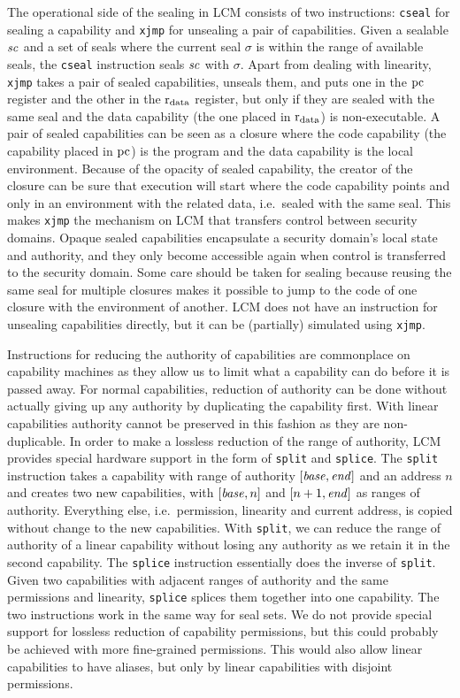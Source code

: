 \documentclass{jfp}
\newcommand{\trgcm}{\textsc{LCM}}
\begin{document}
The operational side of the sealing in \trgcm{} consists of two instructions: \texttt{cseal} for sealing a capability and \texttt{xjmp} for unsealing a pair of capabilities.
Given a sealable $\mathit{sc}$ and a set of seals where the current seal $\sigma$ is within the range of available seals, the \texttt{cseal} instruction seals $\mathit{sc}$ with $\sigma$.
Apart from dealing with linearity, \texttt{xjmp} takes a pair of sealed capabilities, unseals them, and puts one in the $\mathrm{pc}$ register and the other in the $\mathrm{r}_\mathrm{data}$ register, but only if they are sealed with the same seal and the data capability (the one placed in $\mathrm{r}_\mathrm{data}$) is non-executable.
A pair of sealed capabilities can be seen as a closure where the code capability (the capability placed in $\mathrm{pc}$) is the program and the data capability is the local environment.
Because of the opacity of sealed capability, the creator of the closure can be sure that execution will start where the code capability points and only in an environment with the related data, i.e.\ sealed with the same seal.
This makes \texttt{xjmp} the mechanism on \trgcm{} that transfers control between security domains.
Opaque sealed capabilities encapsulate a security domain's local state and authority, and they only become accessible again when control is transferred to the security domain.
Some care should be taken for sealing because reusing the same seal for multiple closures makes it possible to jump to the code of one closure with the environment of another.
\trgcm{} does not have an instruction for unsealing capabilities directly, but it can be (partially) simulated using \texttt{xjmp}.

Instructions for reducing the authority of capabilities are commonplace on capability machines as they allow us to limit what a capability can do before it is passed away.
For normal capabilities, reduction of authority can be done without actually giving up any authority by duplicating the capability first.
With linear capabilities authority cannot be preserved in this fashion as they are non-duplicable.
In order to make a lossless reduction of the range of authority, \trgcm{} provides special hardware support in the form of \texttt{split} and \texttt{splice}.
The \texttt{split} instruction takes a capability with range of authority $[\mathit{base},\mathit{end}]$ and an address $n$ and creates two new capabilities, with $[\mathit{base},n]$ and $[n+1,\mathit{end}]$ as ranges of authority.
Everything else, i.e.\ permission, linearity and current address, is copied without change to the new capabilities.
With \texttt{split}, we can reduce the range of authority of a linear capability without losing any authority as we retain it in the second capability.
The \texttt{splice} instruction essentially does the inverse of \texttt{split}.
Given two capabilities with adjacent ranges of authority and the same permissions and linearity, \texttt{splice} splices them together into one capability.
The two instructions work in the same way for seal sets.
We do not provide special support for lossless reduction of capability permissions, but this could probably be achieved with more fine-grained permissions.
This would also allow linear capabilities to have aliases, but only by linear capabilities with disjoint permissions.
\end{document}
